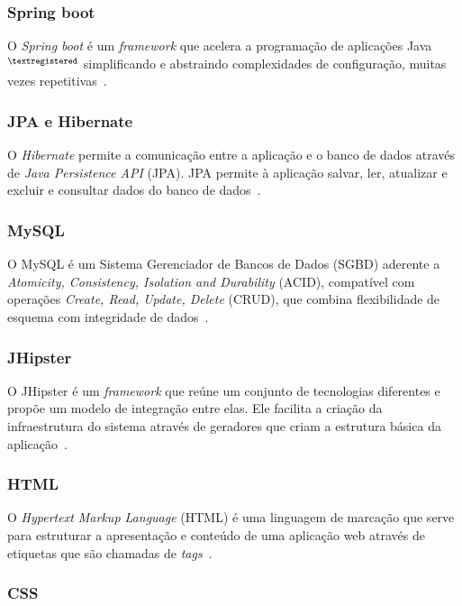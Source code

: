 \subsubsection{Spring boot}

O\textit{ Spring boot} é um \textit{framework} que acelera a programação de aplicações Java$^{\tiny{\textregistered}}$ simplificando e abstraindo complexidades de configuração, muitas vezes repetitivas~\cite{bianchi2015sistema}.

\subsubsection{JPA e Hibernate}

O \textit{Hibernate} permite a comunicação entre a aplicação e o banco de dados através de \textit{Java Persistence API} (JPA).
JPA permite à aplicação salvar, ler, atualizar e excluir e consultar dados do banco de dados~\cite{gonccalves2007desenvolvendo}.

\subsubsection{MySQL}

O MySQL é um Sistema Gerenciador de Bancos de Dados (SGBD) aderente a \textit{Atomicity, Consistency, Isolation and Durability} (ACID), compatível com operações \textit{Create, Read, Update, Delete} (CRUD), que combina flexibilidade de esquema com integridade de dados~\cite{mysql2018}.

\subsubsection{JHipster}
O JHipster é um \textit{framework} que reúne um conjunto de
tecnologias diferentes e propõe um modelo de integração entre elas. Ele facilita a criação da infraestrutura do sistema através
de geradores que criam a estrutura básica da aplicação~\cite{raible2016jhipster}.

\subsubsection{HTML}

O \textit{Hypertext Markup Language} (HTML) é uma linguagem de marcação que serve para estruturar a apresentação e conteúdo de uma aplicação web através de etiquetas que são chamadas de \textit{tags}~\cite{agustin2015model}.

\subsubsection{CSS}

